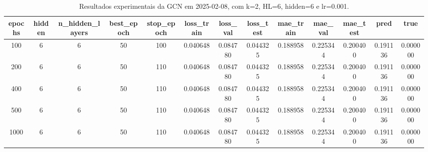 \begin{table}[h]
\centering
\caption{Resultados experimentais da GCN em 2025-02-08, com k=2, HL=6, hidden=6 e lr=0.001.}
\label{tab:gcn_results_k2_hl6_h6_d20250208}
\begin{tabular}{ccccccccccccc}
\toprule
epochs & hidden & n\_hidden\_layers & best\_epoch & stop\_epoch & loss\_train & loss\_val & loss\_test & mae\_train & mae\_val & mae\_test & pred & true \\
\midrule
100 & 6 & 6 & 50 & 100 & 0.040648 & 0.084780 & 0.044325 & 0.188958 & 0.225344 & 0.200400 & 0.191136 & 0.000000 \\
200 & 6 & 6 & 50 & 110 & 0.040648 & 0.084780 & 0.044325 & 0.188958 & 0.225344 & 0.200400 & 0.191136 & 0.000000 \\
400 & 6 & 6 & 50 & 110 & 0.040648 & 0.084780 & 0.044325 & 0.188958 & 0.225344 & 0.200400 & 0.191136 & 0.000000 \\
500 & 6 & 6 & 50 & 110 & 0.040648 & 0.084780 & 0.044325 & 0.188958 & 0.225344 & 0.200400 & 0.191136 & 0.000000 \\
1000 & 6 & 6 & 50 & 110 & 0.040648 & 0.084780 & 0.044325 & 0.188958 & 0.225344 & 0.200400 & 0.191136 & 0.000000 \\
\bottomrule
\end{tabular}
\end{table}
